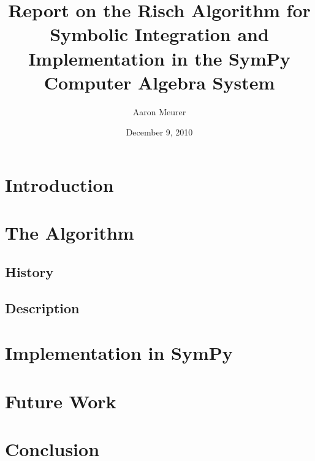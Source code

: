 \documentclass[12pt,titlepage]{article}
\newcommand{\SymPy}{Sym\-Py}
\begin{document}
\title{Report on the Risch Algorithm for Symbolic
Integration and Implementation in the Sym\-Py Computer Algebra System}
\author{Aaron Meurer}
\date{December 9, 2010}
\maketitle
%
\begin{abstract}

\end{abstract}

\tableofcontents

\section{Introduction}
\label{introduction}


\section{The Algorithm}
\subsection{History}
\label{history}


\subsection{Description}
\label{description}


\section{Implementation in \SymPy}
\label{implementation}


\section{Future Work}
\label{future}


\section{Conclusion}
\label{conclusion}


\appendix

\glsaddall
\printglossary

\nocite{*}


\end{document}
